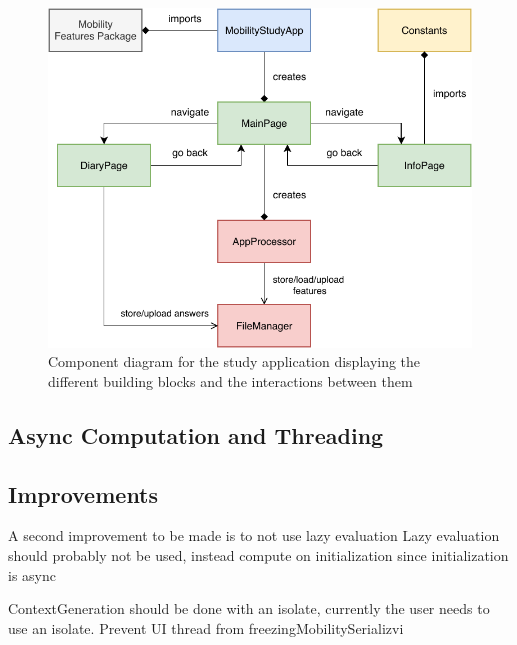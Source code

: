 \begin{figure}
    \centering
    \includegraphics[width=\textwidth]{images/diagrams/app-diagram.pdf}
    \caption{Component diagram for the study application displaying the different building blocks and the interactions between them}
    \label{fig:app-component-diagram}
\end{figure}


\subsection{Async Computation and Threading}


\subsection{Improvements}
A second improvement to be made is to not use lazy evaluation 
Lazy evaluation should probably not be used, instead compute on initialization since initialization is async

ContextGeneration should be done with an isolate, currently the user needs to use an isolate.
Prevent UI thread from freezingMobilitySerializvi